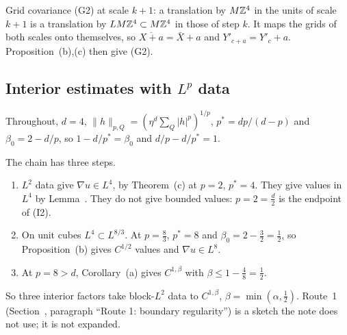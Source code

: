 \begin{detail}
\begin{step}
Grid covariance (G2) at scale $k+1$: a translation by $M\mathbb Z^4$ in the units of scale $k+1$ is a translation by $LM\mathbb Z^4\subset M\mathbb Z^4$ in those of step $k$. It maps the grids of both scales onto themselves, so $\overline{X+a}=\bar X+a$ and $Y'_{c+a}=Y'_c+a$. Proposition~(b),(c) then give (G2).
\end{step}
\end{detail}

\subsection{Interior estimates with \texorpdfstring{$L^p$}{Lp} data}\label{d9:lp}

Throughout, $d=4$, $\|h\|_{p,Q}=(\eta^d\sum_Q|h|^p)^{1/p}$, $p^*=dp/(d-p)$ and $\beta_0=2-d/p$, so $1-d/p^*=\beta_0$ and $d/p-d/p^*=1$.

\begin{detail}\label{d9:chain42}
The chain has three steps.
\begin{enumerate}[label=(\roman*)]
\item $L^2$ data give $\nabla u\in L^4$, by Theorem~(c) at $p=2$, $p^*=4$. They give values in $L^4$ by Lemma~. They do not give bounded values: $p=2=\frac d2$ is the endpoint of (I2).
\item On unit cubes $L^4\subset L^{8/3}$. At $p=\frac83$, $p^*=8$ and $\beta_0=2-\frac32=\frac12$, so Proposition~(b) gives $C^{1/2}$ values and $\nabla u\in L^8$.
\item At $p=8>d$, Corollary~(a) gives $C^{1,\beta}$ with $\beta\le1-\frac48=\frac12$.
\end{enumerate}
So three interior factors take block-$L^2$ data to $C^{1,\beta}$, $\beta=\min(\alpha,\frac12)$. Route~1 (Section~, paragraph ``Route 1: boundary regularity'') is a sketch the note does not use; it is not expanded.
\end{detail}

